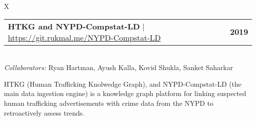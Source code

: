 \documentclass[10pt]{article}
\newcommand{\tabularxwidth}{\textwidth}
\begin{document}
        \begin{tabularx}{\tabularxwidth}{X}
                {
                    \begin{tabularx}{\tabularxwidth}{@{}X r}
                        \textbf{HTKG and NYPD-Compstat-LD}
                            | \url{https://git.rukmal.me/NYPD-Compstat-LD}
                        &
                        \textbf{
        2019} \\
                    \end{tabularx}
                } \\

            
                \textit{Collaborators:} Ryan Hartman, Ayush Kalla, Kovid Shukla, Sanket Saharkar
            

            
    HTKG (Human Trafficking Knolwedge Graph), and NYPD-Compstat-LD (the main data ingestion engine) is a knowledge graph platform for linking suspected human trafficking advertisements with crime data from the NYPD to retroactively assess trends. \\

        \end{tabularx}

        
            \vspace{.3em}
        

    
\end{document}
